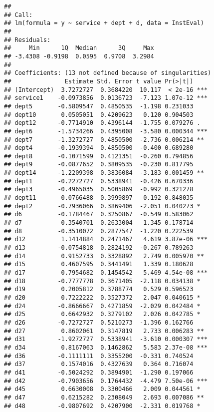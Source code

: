 \documentclass[
]{article}
\begin{document}
\begin{verbatim}
## 
## Call:
## lm(formula = y ~ service + dept + d, data = InstEval)
## 
## Residuals:
##     Min      1Q  Median      3Q     Max 
## -3.4308 -0.9198  0.0595  0.9708  3.2984 
## 
## Coefficients: (13 not defined because of singularities)
##               Estimate Std. Error t value Pr(>|t|)    
## (Intercept)  3.7272727  0.3684220  10.117  < 2e-16 ***
## service1    -0.0973856  0.0136723  -7.123 1.07e-12 ***
## dept5       -0.5809547  0.4850535  -1.198 0.231033    
## dept10       0.0505051  0.4209623   0.120 0.904503    
## dept12      -0.7714910  0.4396144  -1.755 0.079276 .  
## dept6       -1.5734266  0.4395008  -3.580 0.000344 ***
## dept7       -1.3272727  0.4850500  -2.736 0.006214 ** 
## dept4       -0.1939394  0.4850500  -0.400 0.689280    
## dept8       -0.1071599  0.4121351  -0.260 0.794856    
## dept9       -0.0877652  0.3809535  -0.230 0.817795    
## dept14      -1.2209398  0.3836084  -3.183 0.001459 ** 
## dept1       -0.2272727  0.5338941  -0.426 0.670336    
## dept3       -0.4965035  0.5005869  -0.992 0.321278    
## dept11       0.0766488  0.3999897   0.192 0.848035    
## dept2       -0.7936066  0.3869406  -2.051 0.040273 *  
## d6          -0.1784467  0.3250867  -0.549 0.583062    
## d7           0.3540701  0.2633004   1.345 0.178714    
## d8          -0.3510072  0.2877547  -1.220 0.222539    
## d12          1.1414884  0.2471467   4.619 3.87e-06 ***
## d13         -0.0754818  0.2824192  -0.267 0.789263    
## d14          0.9152733  0.3328892   2.749 0.005970 ** 
## d15          0.4607595  0.3441491   1.339 0.180628    
## d17          0.7954682  0.1454542   5.469 4.54e-08 ***
## d18         -0.7777778  0.3671405  -2.118 0.034138 *  
## d19          0.2005812  0.3788774   0.529 0.596523    
## d20          0.7222222  0.3527372   2.047 0.040615 *  
## d24         -0.8666667  0.4271859  -2.029 0.042484 *  
## d25          0.6642932  0.3279102   2.026 0.042785 *  
## d26         -0.7272727  0.5210273  -1.396 0.162766    
## d27          0.8602061  0.3147819   2.733 0.006283 ** 
## d31         -1.9272727  0.5338941  -3.610 0.000307 ***
## d34          0.8167063  0.1462862   5.583 2.37e-08 ***
## d36         -0.1111111  0.3355200  -0.331 0.740524    
## d37          0.1574016  0.4327639   0.364 0.716074    
## d41         -0.5024292  0.3894901  -1.290 0.197066    
## d42         -0.7903656  0.1764432  -4.479 7.50e-06 ***
## d45          0.6630008  0.3300466   2.009 0.044561 *  
## d47          0.6215282  0.2308049   2.693 0.007086 ** 
## d48         -0.9807692  0.4207900  -2.331 0.019768 *  

\end{verbatim}
\end{document}
